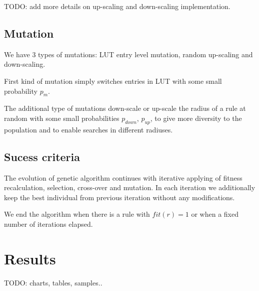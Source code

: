 \documentclass[12pt,a4paper]{article}
\begin{document}
TODO: add more details on up-scaling and down-scaling implementation.

\subsection{Mutation}

We have 3 types of mutations: LUT entry level mutation, random up-scaling and down-scaling.

First kind of mutation simply switches entries in LUT with some small probability $p_m$.

The additional type of mutations down-scale or up-scale the radius of a rule at random with some small probabilities $p_{down}$, $p_{up}$, to give more diversity to the population and to enable searches in different radiuses.

\subsection{Sucess criteria}

The evolution of genetic algorithm continues with iterative applying of fitness recalculation, selection, cross-over and mutation. In each iteration we additionally keep the best individual from previous iteration without any modifications.

We end the algorithm when there is a rule with $fit(r)=1$ or when a fixed number of iterations elapsed. 

\section{Results}

TODO: charts, tables, samples..
\end{document}
